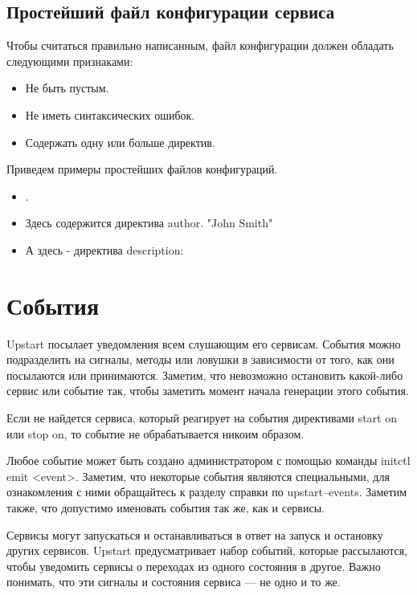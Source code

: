 \subsection{Простейший файл конфигурации сервиса}
Чтобы считаться правильно написанным, файл конфигурации должен обладать следующими признаками: \begin{itemize}
\item Не быть пустым.
\item Не иметь синтаксических ошибок.
\item Содержать одну или больше директив.
\end{itemize}
Приведем примеры простейших файлов конфигураций. 
\begin{itemize}
\item {}.
\item Здесь содержится директива author.  {"John Smith"}  
\item А здесь - директива description:  
\end{itemize}
\section{События}
Upstart посылает уведомления всем слушающим его сервисам. События можно подразделить на сигналы, методы или ловушки в зависимости от того, как они посылаются или принимаются. Заметим, что невозможно остановить какой-либо сервис или событие так, чтобы заметить момент начала генерации этого события.

Если не найдется сервиса, который реагирует на события директивами start on или stop on, то событие не обрабатывается никоим образом.

Любое событие может быть создано администратором с помощью команды initctl emit <event>. Заметим, что некоторые события являются специальными, для ознакомления с ними обращайтесь к разделу справки по upstart--events. Заметим также, что допустимо именовать события так же, как и сервисы.

Сервисы могут запускаться и останавливаться в ответ на запуск и остановку других сервисов. Upstart предусматривает набор событий, которые рассылаются, чтобы уведомить сервисы о переходах из одного состояния в другое. Важно понимать, что эти сигналы и состояния сервиса --- не одно и то же.

